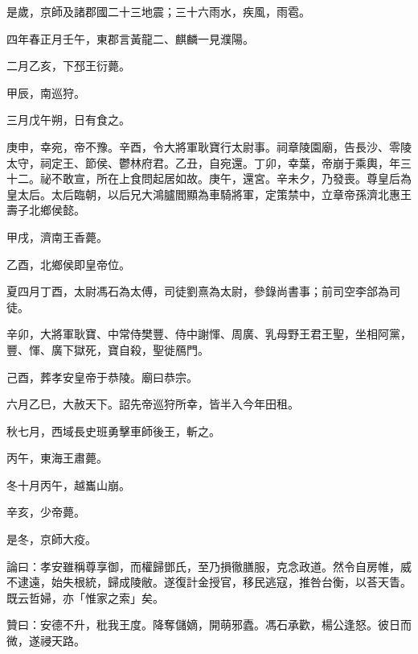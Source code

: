 \begin{pinyinscope}
是歲，京師及諸郡國二十三地震；三十六雨水，疾風，雨雹。

四年春正月壬午，東郡言黃龍二、麒麟一見濮陽。

二月乙亥，下邳王衍薨。

甲辰，南巡狩。

三月戊午朔，日有食之。

庚申，幸宛，帝不豫。辛酉，令大將軍耿寶行太尉事。祠章陵園廟，告長沙、零陵太守，祠定王、節侯、鬱林府君。乙丑，自宛還。丁卯，幸葉，帝崩于乘輿，年三十二。祕不敢宣，所在上食問起居如故。庚午，還宮。辛未夕，乃發喪。尊皇后為皇太后。太后臨朝，以后兄大鴻臚閻顯為車騎將軍，定策禁中，立章帝孫濟北惠王壽子北鄉侯懿。

甲戌，濟南王香薨。

乙酉，北鄉侯即皇帝位。

夏四月丁酉，太尉馮石為太傅，司徒劉熹為太尉，參錄尚書事；前司空李郃為司徒。

辛卯，大將軍耿寶、中常侍樊豐、侍中謝惲、周廣、乳母野王君王聖，坐相阿黨，豐、惲、廣下獄死，寶自殺，聖徙鴈門。

己酉，葬孝安皇帝于恭陵。廟曰恭宗。

六月乙巳，大赦天下。詔先帝巡狩所幸，皆半入今年田租。

秋七月，西域長史班勇擊車師後王，斬之。

丙午，東海王肅薨。

冬十月丙午，越巂山崩。

辛亥，少帝薨。

是冬，京師大疫。

論曰：孝安雖稱尊享御，而權歸鄧氏，至乃損徹膳服，克念政道。然令自房帷，威不逮遠，始失根統，歸成陵敝。遂復計金授官，移民逃寇，推咎台衡，以荅天眚。既云哲婦，亦「惟家之索」矣。

贊曰：安德不升，秕我王度。降奪儲嫡，開萌邪蠹。馮石承歡，楊公逢怒。彼日而微，遂祲天路。


\end{pinyinscope}